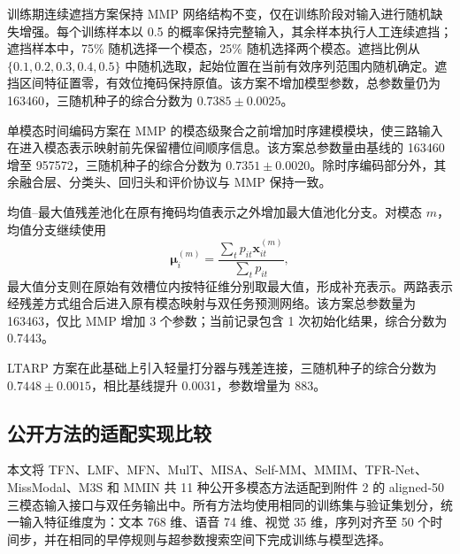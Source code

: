 \documentclass[UTF8,a4paper,11pt]{ctexart}
\begin{document}
训练期连续遮挡方案保持 MMP 网络结构不变，仅在训练阶段对输入进行随机缺失增强。每个训练样本以 0.5 的概率保持完整输入，其余样本执行人工连续遮挡；遮挡样本中，75\% 随机选择一个模态，25\% 随机选择两个模态。遮挡比例从 $\{0.1, 0.2, 0.3, 0.4, 0.5\}$ 中随机选取，起始位置在当前有效序列范围内随机确定。遮挡区间特征置零，有效位掩码保持原值。该方案不增加模型参数，总参数量仍为 163460，三随机种子的综合分数为 $0.7385\pm0.0025$。

单模态时间编码方案在 MMP 的模态级聚合之前增加时序建模模块，使三路输入在进入模态表示映射前先保留槽位间顺序信息。该方案总参数量由基线的 163460 增至 957572，三随机种子的综合分数为 $0.7351\pm0.0020$。除时序编码部分外，其余融合层、分类头、回归头和评价协议与 MMP 保持一致。

均值--最大值残差池化在原有掩码均值表示之外增加最大值池化分支。对模态 $m$，均值分支继续使用
\begin{equation}
\boldsymbol\mu_i^{(m)} = \frac{\sum_t p_{it}\mathbf x_{it}^{(m)}}{\sum_t p_{it}},
\end{equation}
最大值分支则在原始有效槽位内按特征维分别取最大值，形成补充表示。两路表示经残差方式组合后进入原有模态映射与双任务预测网络。该方案总参数量为 163463，仅比 MMP 增加 3 个参数；当前记录包含 1 次初始化结果，综合分数为 0.7443。

LTARP 方案在此基础上引入轻量打分器与残差连接，三随机种子的综合分数为 $0.7448\pm0.0015$，相比基线提升 0.0031，参数增量为 883。

\subsection{公开方法的适配实现比较}\label{subsec:q2_public}
本文将 TFN、LMF、MFN、MulT、MISA、Self-MM、MMIM、TFR-Net、MissModal、M3S 和 MMIN 共 11 种公开多模态方法适配到附件 2 的 aligned-50 三模态输入接口与双任务输出中。所有方法均使用相同的训练集与验证集划分，统一输入特征维度为：文本 768 维、语音 74 维、视觉 35 维，序列对齐至 50 个时间步，并在相同的早停规则与超参数搜索空间下完成训练与模型选择。
\end{document}
